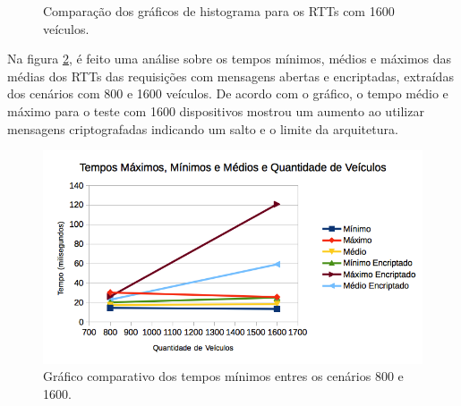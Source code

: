 \documentclass[
	12pt,				%
	oneside,			%
	a4paper,			%
	english,			%
	brazil				%
	]{abntex2ppgsi}
\begin{document}
\begin{figure}[h!]
	\caption{Comparação dos gráficos de histograma para os RTTs com 1600 veículos.}
	\centering
	\label{fig:imghistsec1600}
\end{figure}  

Na figura \ref{fig:graficotempominmaxmed}, é feito uma análise sobre os tempos mínimos, médios e máximos das médias dos RTTs das requisições com mensagens abertas e encriptadas, extraídas dos cenários com 800 e 1600 veículos. De acordo com o gráfico, o tempo médio e máximo para o teste com 1600 dispositivos mostrou um aumento ao utilizar mensagens criptografadas indicando um salto e o limite da arquitetura.

\begin{figure}[h!]
	\centering
	\includegraphics[width=0.7\columnwidth]{images/grafico_tempo_max_min_med.png}
	\caption{Gráfico comparativo dos tempos mínimos entres os cenários 800 e 1600.}
	\label{fig:graficotempominmaxmed}
\end{figure}
\end{document}
